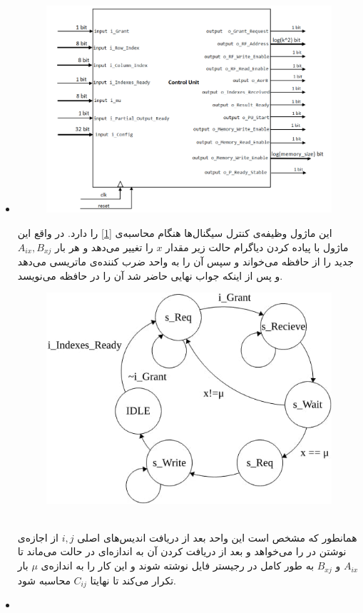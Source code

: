 \documentclass[12pt,onecolumn,a4paper,fleqn]{article}
\begin{document}
\begin{itemize}
\begin{enumerate}[(I)]
	
\end{enumerate}
	
\pagebreak

	\item 

\begin{figure}[h]
	\centering
	\includegraphics[width=0.6\linewidth]{source/control_unit.png}
	\caption{}
\end{figure}
	
	این ماژول وظیفه‌ی کنترل سیگنال‌ها هنگام محاسبه‌ی \autoref{1} را دارد.
	در واقع این ماژول با پیاده کردن دیاگرام حالت زیر مقدار $x$ را تغییر می‌دهد و هر بار $A_{ix},B_{xj}$ جدید را از حافظه‌ می‌خواند و سپس آن را به واحد ضرب کننده‌ی ماتریسی می‌دهد و پس از اینکه جواب نهایی حاضر شد آن را در حافظه می‌نویسد.
	\begin{figure}[h]
		\centering
		\includegraphics[width=0.53\linewidth]{source/fsm_cu.jpg}
		\caption{}
	\end{figure}
\\
همانطور که مشخص است این واحد بعد از دریافت اندیس‌های اصلی $i,j$ از  اجازه‌ی نوشتن در  را می‌خواهد و بعد از دریافت کردن آن به اندازه‌ای در حالت  می‌ماند تا $A_{ix}$ و $B_{xj}$ به طور کامل در رجیستر فایل نوشته شوند و این کار را به انداز‌ه‌ی $\mu$ بار تکرار می‌کند تا نهایتا $C_{ij}$ محاسبه شود.
	
	\item 
	

\end{itemize}
\end{document}
